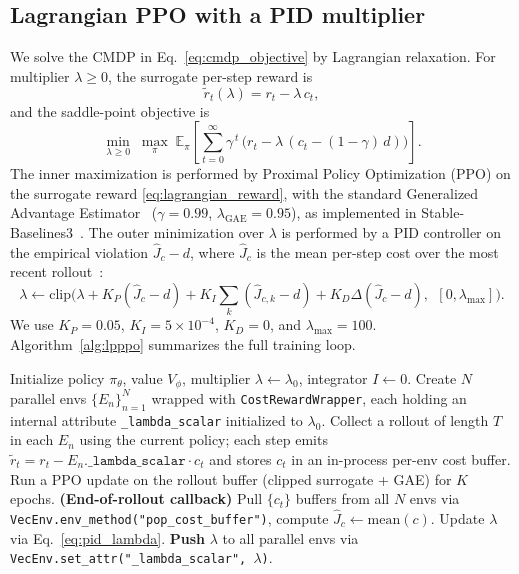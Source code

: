 \subsection{Lagrangian PPO with a PID multiplier}

We solve the CMDP in Eq.~\eqref{eq:cmdp_objective} by Lagrangian
relaxation. For multiplier $\lambda\ge 0$, the surrogate per-step
reward is
\begin{equation}
\tilde r_t(\lambda) = r_t - \lambda\,c_t,
\label{eq:lagrangian_reward}
\end{equation}
and the saddle-point objective is
\begin{equation}
\min_{\lambda\ge 0}\;\max_{\pi}\;
\mathbb{E}_\pi\!\left[\sum_{t=0}^{\infty}\gamma^{\,t}\,
                 \big(r_t - \lambda\,(c_t - (1-\gamma)\,d)\big)\right].
\label{eq:saddle}
\end{equation}
The inner maximization is performed by Proximal Policy Optimization
(PPO) on the surrogate reward \eqref{eq:lagrangian_reward}, with the
standard Generalized Advantage Estimator~\citep{schulman2015gae}
($\gamma=0.99$, $\lambda_{\mathrm{GAE}}=0.95$), as implemented in
Stable-Baselines3~\citep{raffin2021sb3}. The outer minimization over $\lambda$ is
performed by a PID controller on the empirical violation
$\hat J_c - d$, where $\hat J_c$ is the mean per-step cost over the
most recent rollout~\citep{stooke2020responsive}:
\begin{equation}
\lambda \leftarrow \mathrm{clip}\Big(
   \lambda + K_P(\hat J_c - d) + K_I\!\!\sum_{k}(\hat J_{c,k}-d)
   + K_D\Delta(\hat J_c-d),\;\,
   [0,\lambda_{\max}]\Big).
\label{eq:pid_lambda}
\end{equation}
We use $K_P=0.05$, $K_I=5\times 10^{-4}$, $K_D=0$, and
$\lambda_{\max}=100$. Algorithm~\ref{alg:lpppo} summarizes the full
training loop.

\begin{algorithm}[t]
\caption{Lagrangian PPO with PID multiplier and subprocess-safe
$\lambda$ propagation.}
\label{alg:lpppo}
\begin{algorithmic}[1]
\State Initialize policy $\pi_\theta$, value $V_\phi$, multiplier
       $\lambda \leftarrow \lambda_0$, integrator $I\leftarrow 0$.
\State Create $N$ parallel envs $\{E_n\}_{n=1}^N$ wrapped with
       \texttt{CostRewardWrapper}, each holding an internal
       attribute \texttt{\_lambda\_scalar} initialized to $\lambda_0$.
  \State Collect a rollout of length $T$ in each $E_n$ using the
         current policy; each step emits
         $\tilde r_t = r_t - E_n.\texttt{\_lambda\_scalar}\cdot c_t$
         and stores $c_t$ in an in-process per-env cost buffer.
  \State Run a PPO update on the rollout buffer (clipped surrogate
         + GAE) for $K$ epochs.
  \State \textbf{(End-of-rollout callback)} Pull
         $\{c_t\}$ buffers from all $N$ envs via
         \texttt{VecEnv.env\_method("pop\_cost\_buffer")}, compute
         $\hat J_c \leftarrow \mathrm{mean}(c)$.
  \State Update $\lambda$ via Eq.~\eqref{eq:pid_lambda}.
  \State \textbf{Push} $\lambda$ to all parallel envs via
         \texttt{VecEnv.set\_attr("\_lambda\_scalar",~$\lambda$)}.
\EndFor
\end{algorithmic}
\end{algorithm}

